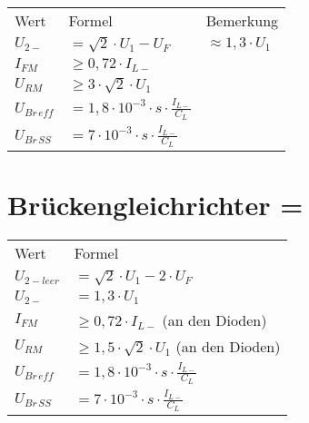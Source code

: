     \begin{table}[H]
        \begin{tabularx}{\columnwidth}{l l l}
            Wert & Formel & Bemerkung \\
            $U_{2-}$ & $=\sqrt{2}\cdot U_1-U_F$ & $\approx 1,3\cdot U_1 $ \\
            $I_{FM}$ & $\geq 0,72\cdot I_{L-}$ \\
            $U_{RM}$ & $\geq 3\cdot \sqrt{2}\cdot U_1$\\
            $U_{Br\, eff}$ & $=1,8\cdot 10^{-3}\cdot s\cdot\frac{I_{L-}}{C_L}$ \\
            $U_{Br\, SS}$ & $=7\cdot 10^{-3}\cdot s\cdot\frac{I_{L-}}{C_L}$ \\
        \end{tabularx}
    \end{table}

    \section{Brückengleichrichter = }\label{sec:bruckengleichrichter}
    \begin{minipage}{0.5\columnwidth}
    \begin{table}[H]
        \begin{tabularx}{\columnwidth}{l l}
        Wert & Formel \\
        $U_{2-leer}$ & $=\sqrt{2}\cdot U_1-2\cdot U_F$ \\
        $U_{2-}$ & $=1,3\cdot U_1$ \\
        $I_{FM}$ & $\geq 0,72\cdot I_{L-}$ (an den Dioden) \\
        $U_{RM}$ & $\geq 1,5\cdot\sqrt{2}\cdot U_1$ (an den Dioden) \\
        $U_{Br\,eff}$ & $=1,8\cdot 10^{-3}\cdot s \cdot\frac{I_{L-}}{C_L}$ \\
        $U_{Br\,SS}$ & $=7\cdot 10^{-3}\cdot s \cdot\frac{I_{L-}}{C_L}$ \\
        \end{tabularx}
    \end{table}

    \end{minipage}
    \begin{minipage}{0.5\columnwidth}
    \end{minipage}

